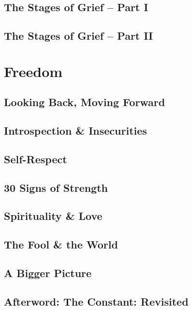 \documentclass{article}
\numberwithin{equation}{section}
\begin{document}
\subsection{The Stages of Grief -- Part I}

\subsection{The Stages of Grief -- Part II}


\section{Freedom}

\subsection{Looking Back, Moving Forward}

\subsection{Introspection \& Insecurities}

\subsection{Self-Respect}

\subsection{30 Signs of Strength}

\subsection{Spirituality \& Love}

\subsection{The Fool \& the World}

\subsection{A Bigger Picture}

\subsection{Afterword: The Constant: Revisited}


\printbibliography[heading=bibintoc]
	
\end{document}

